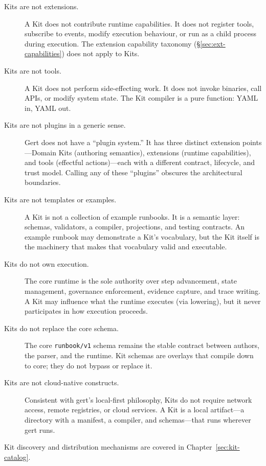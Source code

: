 \begin{description}
  \item[Kits are not extensions.] A Kit does not contribute runtime
    capabilities.  It does not register tools, subscribe to events, modify
    execution behaviour, or run as a child process during execution.  The
    extension capability taxonomy (\S\ref{sec:ext-capabilities}) does not
    apply to Kits.

  \item[Kits are not tools.] A Kit does not perform side-effecting work.  It
    does not invoke binaries, call APIs, or modify system state.  The Kit
    compiler is a pure function: YAML in, YAML out.

  \item[Kits are not plugins in a generic sense.] Gert does not have a
    ``plugin system.''  It has three distinct extension points---Domain Kits
    (authoring semantics), extensions (runtime capabilities), and tools
    (effectful actions)---each with a different contract, lifecycle, and trust
    model.  Calling any of these ``plugins'' obscures the architectural
    boundaries.

  \item[Kits are not templates or examples.] A Kit is not a collection of
    example runbooks.  It is a semantic layer: schemas, validators, a compiler,
    projections, and testing contracts.  An example runbook may demonstrate a
    Kit's vocabulary, but the Kit itself is the machinery that makes that
    vocabulary valid and executable.

  \item[Kits do not own execution.] The core runtime is the sole authority
    over step advancement, state management, governance enforcement, evidence
    capture, and trace writing.  A Kit may influence what the runtime executes
    (via lowering), but it never participates in how execution proceeds.

  \item[Kits do not replace the core schema.] The core \texttt{runbook/v1}
    schema remains the stable contract between authors, the parser, and the
    runtime.  Kit schemas are overlays that compile down to core; they do not
    bypass or replace it.

  \item[Kits are not cloud-native constructs.] Consistent with gert's
    local-first philosophy, Kits do not require network access, remote
    registries, or cloud services.  A Kit is a local artifact---a directory
    with a manifest, a compiler, and schemas---that runs wherever gert runs.
\end{description}

Kit discovery and distribution mechanisms are covered in Chapter~\ref{sec:kit-catalog}.
